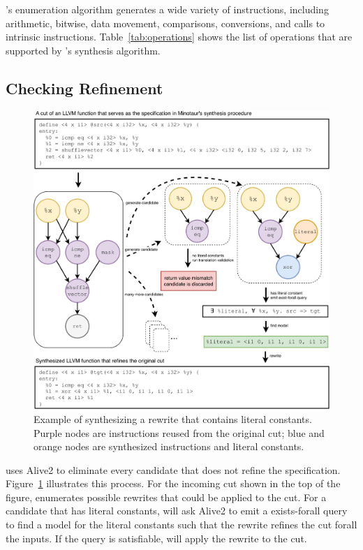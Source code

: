 \minotaur{}'s enumeration algorithm generates a wide variety of instructions,
including arithmetic, bitwise, data movement, comparisons, conversions,
and calls to intrinsic instructions.
%
Table~\ref{tab:operations} shows the list of operations that are
supported by \minotaur{}'s synthesis algorithm.



\subsection{Checking Refinement}


\begin {figure}[tbp]
  \centering
  \includegraphics[width=\linewidth]{figures/solve_literal.pdf}
  \caption{Example of synthesizing a rewrite that contains literal
    constants.  Purple nodes are instructions reused from the original
    cut; blue and orange nodes are synthesized instructions and
    literal constants.}
  \label{fig:synthesizing}
\end{figure}

\minotaur{} uses Alive2 to eliminate every candidate that does not refine
the specification.
%
Figure~\ref{fig:synthesizing} illustrates this process.
%
For the incoming cut shown in the top of the figure, \minotaur{}
enumerates possible rewrites that could be applied to the cut.
%
For a candidate that has literal constants, \minotaur{} will ask Alive2 to
emit a exists-forall query to find a model for the literal constants
such that the rewrite refines the cut forall the inputs.
%
If the query is satisfiable, \minotaur{} will apply the rewrite to the
cut.


